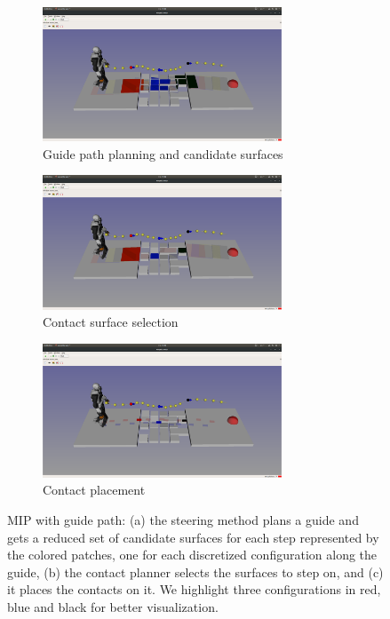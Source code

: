 \begin{figure}[h!]
    \centering
    \captionsetup[subfigure]{justification=centering}
    \begin{subfigure}[t]{0.7\linewidth}
        \includegraphics[trim={10cm 8cm 10cm 10cm},clip,width=\textwidth,height=4cm]{Figures/Chapter_MIP_SL1M/rubbles/rubbles_steps_4_9_14.png}
        \caption{Guide path planning and candidate surfaces\label{fig:rubbles:surf_sel_0}}
    \end{subfigure}
    \begin{subfigure}[t]{0.7\linewidth}
        \includegraphics[trim={10cm 8cm 10cm 10cm},clip,width=\textwidth,height=4cm]{Figures/Chapter_MIP_SL1M/rubbles/rubbles_steps_4_9_14_selected.png}
        \caption{Contact surface selection\label{fig:rubbles:surf_sel_1}}
    \end{subfigure}
    \begin{subfigure}[t]{0.7\linewidth}
        \includegraphics[trim={10cm 8cm 10cm 10cm},clip,width=\textwidth,height=4cm]{Figures/Chapter_MIP_SL1M/rubbles/rubbles_steps_4_9_14_steps.png}
        \caption{Contact placement\label{fig:rubbles:surf_sel_2}}
    \end{subfigure}
    \caption{MIP with guide path: (a) the steering method plans a guide and gets a reduced set of candidate surfaces for each step represented by the colored patches, one for each discretized configuration along the guide, (b) the contact planner selects the surfaces to step on, and (c) it places the contacts on it. We highlight three configurations in red, blue and black for better visualization.\label{fig:rubbles:surf_sel}}
\end{figure}


